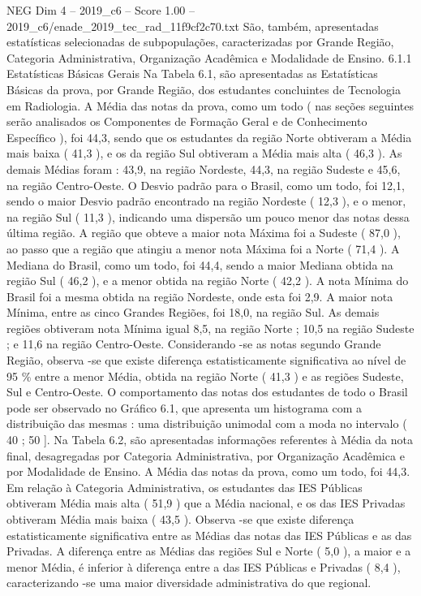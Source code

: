 \begin{textsample}{NEG Dim 4 – 2019\_c6 – Score 1.00 – 2019\_c6/enade\_2019\_tec\_rad\_11f9cf2c70.txt}
São, também, apresentadas estatísticas selecionadas de subpopulações, caracterizadas por Grande Região, Categoria Administrativa, Organização Acadêmica e Modalidade de Ensino. 6.1.1 Estatísticas Básicas Gerais Na Tabela 6.1, são apresentadas as Estatísticas Básicas da prova, por Grande Região, dos estudantes concluintes de Tecnologia em Radiologia.
A Média das notas da prova, como um todo ( nas seções seguintes serão analisados os Componentes de Formação Geral e de Conhecimento Específico ), foi 44,3, sendo que os estudantes da região Norte obtiveram a Média mais baixa ( 41,3 ), e os da região Sul obtiveram a Média mais alta ( 46,3 ).
As demais Médias foram : 43,9, na região Nordeste, 44,3, na região Sudeste e 45,6, na região Centro-Oeste.
O Desvio padrão para o Brasil, como um todo, foi 12,1, sendo o maior Desvio padrão encontrado na região Nordeste ( 12,3 ), e o menor, na região Sul ( 11,3 ), indicando uma dispersão um pouco menor das notas dessa última região.
A região que obteve a maior nota Máxima foi a Sudeste ( 87,0 ), ao passo que a região que atingiu a menor nota Máxima foi a Norte ( 71,4 ).
A Mediana do Brasil, como um todo, foi 44,4, sendo a maior Mediana obtida na região Sul ( 46,2 ), e a menor obtida na região Norte ( 42,2 ).
A nota Mínima do Brasil foi a mesma obtida na região Nordeste, onde esta foi 2,9.
A maior nota Mínima, entre as cinco Grandes Regiões, foi 18,0, na região Sul.
As demais regiões obtiveram nota Mínima igual 8,5, na região Norte ; 10,5 na região Sudeste ; e 11,6 na região Centro-Oeste.
Considerando -se as notas segundo Grande Região, observa -se que existe diferença estatisticamente significativa ao nível de 95 \% entre a menor Média, obtida na região Norte ( 41,3 ) e as regiões Sudeste, Sul e Centro-Oeste.
O comportamento das notas dos estudantes de todo o Brasil pode ser observado no Gráfico 6.1, que apresenta um histograma com a distribuição das mesmas : uma distribuição unimodal com a moda no intervalo ( 40 ; 50 ].
Na Tabela 6.2, são apresentadas informações referentes à Média da nota final, desagregadas por Categoria Administrativa, por Organização Acadêmica e por Modalidade de Ensino.
A Média das notas da prova, como um todo, foi 44,3.
Em relação à Categoria Administrativa, os estudantes das IES Públicas obtiveram Média mais alta ( 51,9 ) que a Média nacional, e os das IES Privadas obtiveram Média mais baixa ( 43,5 ).
Observa -se que existe diferença estatisticamente significativa entre as Médias das notas das IES Públicas e as das Privadas.
A diferença entre as Médias das regiões Sul e Norte ( 5,0 ), a maior e a menor Média, é inferior à diferença entre a das IES Públicas e Privadas ( 8,4 ), caracterizando -se uma maior diversidade administrativa do que regional.

\end{textsample}
